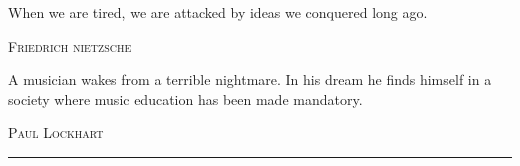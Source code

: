 \begin{titlepage}

\noindent
\par


\epigraph{When we are tired, we are attacked 
by ideas we conquered long ago.}
    {\textsc{Friedrich nietzsche}}
\epigraph{ A musician wakes from a terrible nightmare. In his dream he finds
himself in a society where music education has been made mandatory.}
    {\textsc{Paul Lockhart}}

\null\vfill
\vspace*{1cm}
\noindent
\hfill
\begin{minipage}{0.35\linewidth}
    \begin{flushright}
        \printauthor
    \end{flushright}
\end{minipage}
%
\begin{minipage}{0.02\linewidth}
    \rule{1pt}{125pt}
\end{minipage}
\titlepagedecoration
\end{titlepage}
